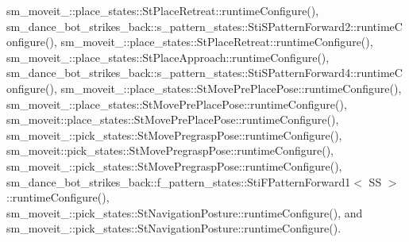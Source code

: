 sm\+\_\+moveit\+\_\+::place\+\_\+states\+::\+St\+Place\+Retreat\+::runtime\+Configure(), sm\+\_\+dance\+\_\+bot\+\_\+strikes\+\_\+back\+::s\+\_\+pattern\+\_\+states\+::\+Sti\+S\+Pattern\+Forward2\+::runtime\+Configure(), sm\+\_\+moveit\+\_\+::place\+\_\+states\+::\+St\+Place\+Retreat\+::runtime\+Configure(), sm\+\_\+moveit\+\_\+::place\+\_\+states\+::\+St\+Place\+Approach\+::runtime\+Configure(), sm\+\_\+dance\+\_\+bot\+\_\+strikes\+\_\+back\+::s\+\_\+pattern\+\_\+states\+::\+Sti\+S\+Pattern\+Forward4\+::runtime\+Configure(), sm\+\_\+moveit\+\_\+::place\+\_\+states\+::\+St\+Move\+Pre\+Place\+Pose\+::runtime\+Configure(), sm\+\_\+moveit\+\_\+::place\+\_\+states\+::\+St\+Move\+Pre\+Place\+Pose\+::runtime\+Configure(), sm\+\_\+moveit\+::place\+\_\+states\+::\+St\+Move\+Pre\+Place\+Pose\+::runtime\+Configure(), sm\+\_\+moveit\+\_\+::pick\+\_\+states\+::\+St\+Move\+Pregrasp\+Pose\+::runtime\+Configure(), sm\+\_\+moveit\+::pick\+\_\+states\+::\+St\+Move\+Pregrasp\+Pose\+::runtime\+Configure(), sm\+\_\+moveit\+\_\+::pick\+\_\+states\+::\+St\+Move\+Pregrasp\+Pose\+::runtime\+Configure(), sm\+\_\+dance\+\_\+bot\+\_\+strikes\+\_\+back\+::f\+\_\+pattern\+\_\+states\+::\+Sti\+F\+Pattern\+Forward1$<$ S\+S $>$\+::runtime\+Configure(), sm\+\_\+moveit\+\_\+::pick\+\_\+states\+::\+St\+Navigation\+Posture\+::runtime\+Configure(), and sm\+\_\+moveit\+\_\+::pick\+\_\+states\+::\+St\+Navigation\+Posture\+::runtime\+Configure().



